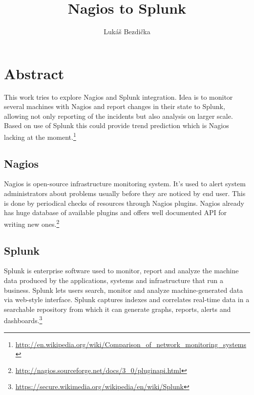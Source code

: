 \documentclass[10pt,a4paper,final]{report}
\author{Lukáš Bezdička}
\title{Nagios to Splunk}
\begin{document}
\setcounter{page}{1}

\chapter*{Abstract}
This work tries to explore Nagios and Splunk integration. Idea is to monitor several machines with Nagios and report changes in their state to Splunk, allowing not only reporting of the incidents but also analysis on larger scale. Based on use of Splunk this could provide trend prediction which is Nagios lacking at the moment.\footnote{\url{http://en.wikipedia.org/wiki/Comparison\_of\_network\_monitoring\_systems}}

\section*{Nagios}

Nagios is open-source infrastructure monitoring system. It's used to alert system administrators about problems usually before they are noticed by end user. This is done by periodical checks of resources through Nagios plugins. Nagios already has huge database of available plugins and offers well documented API for writing new ones.\footnote{\url{http://nagios.sourceforge.net/docs/3\_0/pluginapi.html}}

\section*{Splunk}
Splunk is enterprise software used to monitor, report and analyze the machine data produced by the applications, systems and infrastructure that run a business. Splunk lets users search, monitor and analyze machine-generated data via web-style interface. Splunk captures indexes and correlates real-time data in a searchable repository from which it can generate graphs, reports, alerts and dashboards.\footnote{\url{https://secure.wikimedia.org/wikipedia/en/wiki/Splunk}}
\newpage

\setcounter{tocdepth}{3}
\setcounter{page}{1}

\tableofcontents
\end{document}
